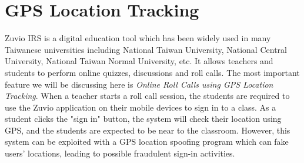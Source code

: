 \section{GPS Location Tracking}
Zuvio IRS is a digital education tool which has been widely used in many Taiwanese universities
including National Taiwan University, National Central University, National Taiwan Normal University, etc.
It allows teachers and students to perform online quizzes, discussions and roll calls. The most
important feature we will be discussing here is \emph{Online Roll Calls using GPS Location Tracking}.
When a teacher starts a roll call session, the students are required to use the Zuvio application
on their mobile devices to sign in to a class. As a student clicks the "sign in" button, the system will
check their location using GPS, and the students are expected to be near to the classroom. However, this
system can be exploited with a GPS location spoofing program which can fake users' locations,
leading to possible fraudulent sign-in activities.

